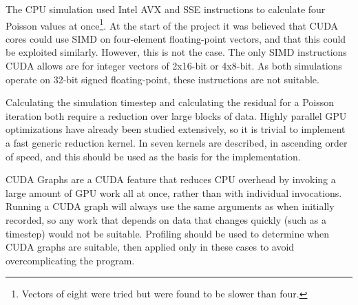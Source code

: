 The CPU simulation used Intel AVX and SSE instructions\cite{IntelCorporationIntroductionExtensions} to calculate four Poisson values at once\footnote{Vectors of eight were tried but were found to be slower than four.}.
At the start of the project it was believed that CUDA cores could use SIMD on four-element floating-point vectors, and that this could be exploited similarly.
However, this is not the case.
The only SIMD instructions CUDA allows are for integer vectors of 2x16-bit or 4x8-bit\cite{NvidiaCUDASIMD}.%
As both simulations operate on 32-bit signed floating-point, these instructions are not suitable.


Calculating the simulation timestep and calculating the residual for a Poisson iteration both require a reduction over large blocks of data.
Highly parallel GPU optimizations have already been studied extensively, so it is trivial to implement a fast generic reduction kernel.
In \cite{CUDAParallelReduction} seven kernels are described, in ascending order of speed, and this should be used as the basis for the implementation.

CUDA Graphs \cite{GrayCUDAGraph2019Blog} are a CUDA feature that reduces CPU overhead by invoking a large amount of GPU work all at once, rather than with individual invocations.
Running a CUDA graph will always use the same arguments as when initially recorded, so any work that depends on data that changes quickly (such as a timestep) would not be suitable.
Profiling should be used to determine when CUDA graphs are suitable, then applied only in these cases to avoid overcomplicating the program.